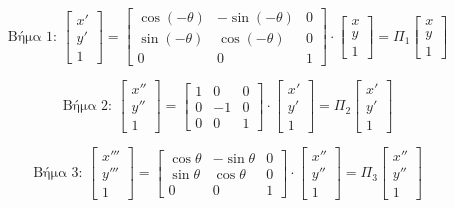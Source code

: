 \[
\text{Βήμα 1: } 
\begin{bmatrix}
x' \\ y' \\ 1
\end{bmatrix}
=
\begin{bmatrix}
\cos(-\theta) & -\sin(-\theta) & 0 \\
\sin(-\theta) & \cos(-\theta) & 0 \\
0 & 0 & 1
\end{bmatrix}
\cdot
\begin{bmatrix}
x \\ y \\ 1
\end{bmatrix}
= \Pi_1
\begin{bmatrix}
x \\ y \\ 1
\end{bmatrix}
\]

\[
\text{Βήμα 2: } 
\begin{bmatrix}
x'' \\ y'' \\ 1
\end{bmatrix}
=
\begin{bmatrix}
1 & 0 & 0 \\
0 & -1 & 0 \\
0 & 0 & 1
\end{bmatrix}
\cdot
\begin{bmatrix}
x' \\ y' \\ 1
\end{bmatrix}
= \Pi_2
\begin{bmatrix}
x' \\ y' \\ 1
\end{bmatrix}
\]

\[
\text{Βήμα 3: } 
\begin{bmatrix}
x''' \\ y''' \\ 1
\end{bmatrix}
=
\begin{bmatrix}
\cos \theta & -\sin \theta & 0 \\
\sin \theta & \cos \theta & 0 \\
0 & 0 & 1
\end{bmatrix}
\cdot
\begin{bmatrix}
x'' \\ y'' \\ 1
\end{bmatrix}
= \Pi_3
\begin{bmatrix}
x'' \\ y'' \\ 1
\end{bmatrix}
\]

